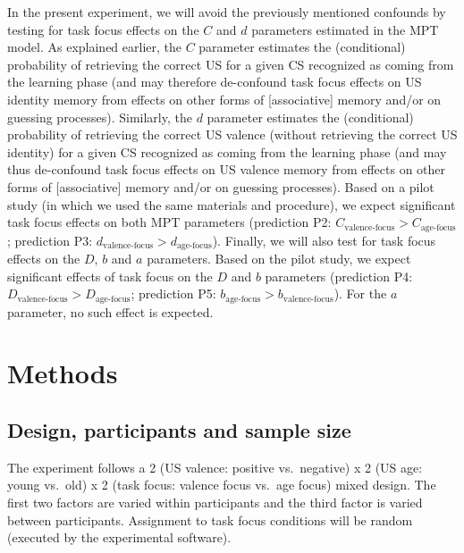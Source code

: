 \documentclass[
  doc,floatsintext]{apa6}
\begin{document}
In the present experiment, we will avoid the previously mentioned confounds by testing for task focus effects on the \(C\) and \(d\) parameters estimated in the MPT model.
As explained earlier, the \(C\) parameter estimates the (conditional) probability of retrieving the correct US for a given CS recognized as coming from the learning phase (and may therefore de-confound task focus effects on US identity memory from effects on other forms of {[}associative{]} memory and/or on guessing processes).
Similarly, the \(d\) parameter estimates the (conditional) probability of retrieving the correct US valence (without retrieving the correct US identity) for a given CS recognized as coming from the learning phase (and may thus de-confound task focus effects on US valence memory from effects on other forms of {[}associative{]} memory and/or on guessing processes).
Based on a pilot study (in which we used the same materials and procedure), we expect significant task focus effects on both MPT parameters (prediction P2: \(C_\textrm{valence-focus}>C_\textrm{age-focus}\); prediction P3: \(d_\textrm{valence-focus}>d_\textrm{age-focus}\)).
Finally, we will also test for task focus effects on the \(D\), \(b\) and \(a\) parameters.
Based on the pilot study, we expect significant effects of task focus on the \(D\) and \(b\) parameters (prediction P4: \(D_\textrm{valence-focus}>D_\textrm{age-focus}\); prediction P5: \(b_\textrm{age-focus}>b_\textrm{valence-focus}\)).
For the \(a\) parameter, no such effect is expected.

\hypertarget{methods}{%
\section{Methods}\label{methods}}

\hypertarget{design-participants-and-sample-size}{%
\subsection{Design, participants and sample size}\label{design-participants-and-sample-size}}

The experiment follows a 2 (US valence: positive vs.~negative) x 2 (US age: young vs.~old) x 2 (task focus: valence focus vs.~age focus) mixed design.
The first two factors are varied within participants and the third factor is varied between participants.
Assignment to task focus conditions will be random (executed by the experimental software).
\end{document}
